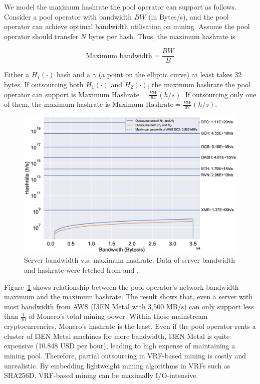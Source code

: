 We model the maximum hashrate the pool operator can support as follows.
Consider a pool operator with bandwidth $BW$ (in Bytes/s), and the pool operator can achieve optimal bandwidth utilisation on mining.
Assume the pool operator should transfer $N$ bytes per hash.
Thus, the maximum hashrate is

$$\text{Maximum bandwidth} = \frac{BW}{B}$$

Either a $H_1(\cdot)$ hash and a $\gamma$ (a point on the elliptic curve) at least takes 32 bytes.
If outsourcing both $H_1(\cdot)$ and $H_2(\cdot)$, the maximum hashrate the pool operator can support is $\text{Maximum Hashrate} = \frac{BW}{64} (h/s)$.
If outsourcing only one of them, the maximum hashrate is $\text{Maximum Hashrate} = \frac{BW}{32} (h/s)$.

\begin{figure}[htp]
    \centering
    \includegraphics[width=\linewidth]{figs/max-hashrate.eps}
    \caption{Server bandwidth v.s. maximum hashrate.
    Data of server bandwidth and hashrate were fetched from \cite{aws} and \cite{coinwarz}.}
    \label{fig:max-hashrate}
\end{figure}

Figure~\ref{fig:max-hashrate} shows relationship between the pool operator's network bandwidth maximum and the maximum hashrate.
The result shows that, even a server with most bandwidth from AWS (I3EN Metal with 3,500 MB/s) can only support less than $\frac{1}{10}$ of Monero's total mining power.
Within those mainstream cryptocurrencies, Monero's hashrate is the least.
Even if the pool operator rents a cluster of I3EN Metal machines for more bandwidth, I3EN Metal is quite expensive (10.848 USD per hour), leading to high expense of maintaining a mining pool.
Therefore, partial outsourcing in VRF-based mining is costly and unrealistic.
By embedding lightweight mining algorithms in VRFs such as SHA256D, VRF-based mining can be maximally I/O-intensive.
